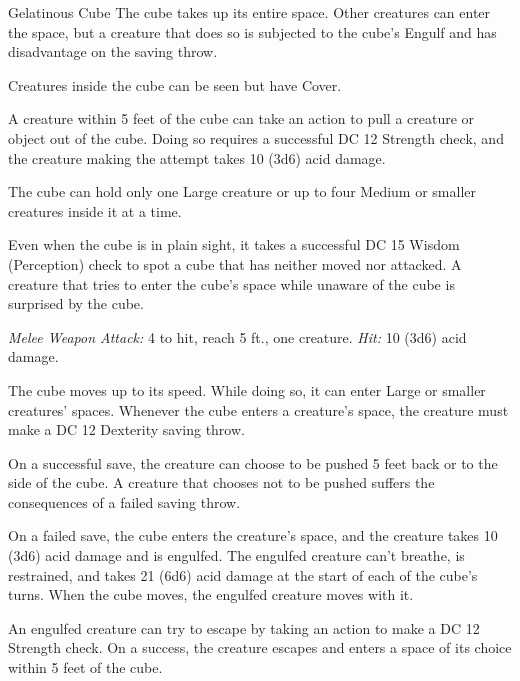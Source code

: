 \documentclass[10pt,a4paper,twoside,bg=print,twocolumn,openany,nodeprecatedcode]{dndbook}
\begin{document}
\begin{DndMonster}[float=t]{Gelatinous Cube}
\DndMonsterBasics[
armor-class = {6},
hit-points = {\DndDice{8d10 + 40}},
speed = {15 ft.}
]
\DndMonsterAbilityScores[
 str = 14,
 dex = 3,
 con = 20,
 int = 1,
 wis = 6,
 cha = 1
]
\DndMonsterDetails[
condition-immunities = {blinded, charmed, deafened, exhaustion, frightened, prone},
senses = {blindsight 60 ft. (blind beyond this radius), passive perception 8},
challenge = 2,
]
The cube takes up its entire space. Other creatures can enter the space, but a creature that does so is subjected to the cube's Engulf and has disadvantage on the saving throw.

Creatures inside the cube can be seen but have Cover.

A creature within 5 feet of the cube can take an action to pull a creature or object out of the cube. Doing so requires a successful DC 12 Strength check, and the creature making the attempt takes 10 (3d6) acid damage.

The cube can hold only one Large creature or up to four Medium or smaller creatures inside it at a time.

Even when the cube is in plain sight, it takes a successful DC 15 Wisdom (Perception) check to spot a cube that has neither moved nor attacked. A creature that tries to enter the cube's space while unaware of the cube is surprised by the cube.

\textsl{Melee Weapon Attack:} 4 to hit, reach 5 ft., one creature. \textsl{Hit:} 10 (3d6) acid damage.

The cube moves up to its speed. While doing so, it can enter Large or smaller creatures' spaces. Whenever the cube enters a creature's space, the creature must make a DC 12 Dexterity saving throw.

On a successful save, the creature can choose to be pushed 5 feet back or to the side of the cube. A creature that chooses not to be pushed suffers the consequences of a failed saving throw.

On a failed save, the cube enters the creature's space, and the creature takes 10 (3d6) acid damage and is engulfed. The engulfed creature can't breathe, is restrained, and takes 21 (6d6) acid damage at the start of each of the cube's turns. When the cube moves, the engulfed creature moves with it.

An engulfed creature can try to escape by taking an action to make a DC 12 Strength check. On a success, the creature escapes and enters a space of its choice within 5 feet of the cube.

\end{DndMonster}
\end{document}
